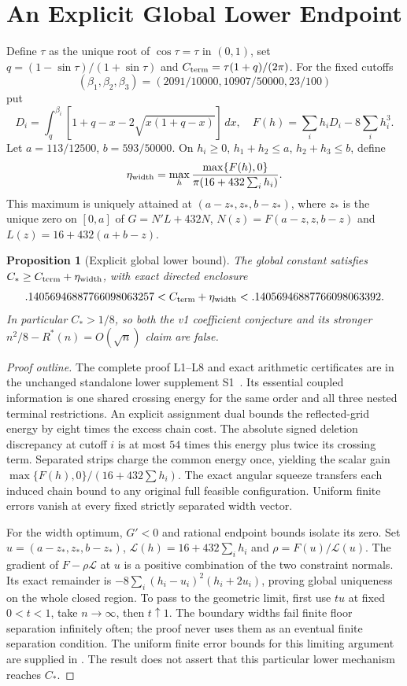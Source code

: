 \documentclass[11pt,letterpaper]{article}
\newtheorem{proposition}[theorem]{Proposition}
\theoremstyle{definition}\newtheorem{definition}[theorem]{Definition}
\theoremstyle{remark}\newtheorem{remark}[theorem]{Remark}
\newcommand{\Rstar}{R^\ast}
\newcommand{\CC}{C_\ast}
\begin{document}
\section{An Explicit Global Lower Endpoint}

Define $\tau$ as the unique root of $\cos\tau=\tau$ in $(0,1)$, set
$q=(1-\sin\tau)/(1+\sin\tau)$ and
$C_{\rm term}=\tau(1+q)/(2\pi)$.
For the fixed cutoffs
\[
 (\beta_1,\beta_2,\beta_3)=(2091/10000,10907/50000,23/100)
\]
put
\[
 D_i=\int_q^{\beta_i}[1+q-x-2\sqrt{x(1+q-x)}]\,dx,
 \quad F(h)=\sum_i h_iD_i-8\sum_i h_i^3.
\]
Let $a=113/12500$, $b=593/50000$. On
$h_i\ge0$, $h_1+h_2\le a$, $h_2+h_3\le b$, define
\[
 \eta_{\rm width}=\max_h
 \frac{\max\{F(h),0\}}{\pi(16+432\sum_i h_i)}.
\]
This maximum is uniquely attained at $(a-z_*,z_*,b-z_*)$, where $z_*$
is the unique zero on $[0,a]$ of $G=N'L+432N$,
$N(z)=F(a-z,z,b-z)$ and $L(z)=16+432(a+b-z)$.

\begin{proposition}[Explicit global lower bound]\label{prop:lower}
The global constant satisfies $\CC\ge C_{\rm term}+\eta_{\rm width}$,
with exact directed enclosure
\[
 .14056946887766098063257
 < C_{\rm term}+\eta_{\rm width}
 < .14056946887766098063392.
\]
In particular $\CC>1/8$, so both the v1 coefficient conjecture and its
stronger $n^2/8-\Rstar(n)=O(\sqrt n)$ claim are false.
\end{proposition}
\begin{proof}[Proof outline]
The complete proof L1--L8 and exact arithmetic certificates are in the
unchanged standalone lower supplement S1~\cite{lower}.
Its essential coupled information is one shared crossing energy for the
same order and all three nested terminal restrictions. An explicit assignment
dual bounds the reflected-grid energy by eight times the excess chain cost.
The absolute signed deletion discrepancy at cutoff $i$ is at most $54$
times this energy plus twice its crossing term. Separated strips charge
the common energy once, yielding
the scalar gain $\max\{F(h),0\}/(16+432\sum h_i)$.
The exact angular squeeze transfers each induced chain bound to any original
full feasible configuration. Uniform finite errors vanish at every fixed
strictly separated width vector.

For the width optimum, $G'<0$ and rational endpoint bounds isolate its zero.
Set $u=(a-z_*,z_*,b-z_*)$, $\mathcal L(h)=16+432\sum_i h_i$ and
$\rho=F(u)/\mathcal L(u)$. The gradient of $F-\rho\mathcal L$ at $u$ is a positive
combination of the two constraint normals. Its exact remainder is
$-8\sum_i(h_i-u_i)^2(h_i+2u_i)$, proving global uniqueness on the whole
closed region. To pass to the geometric limit, first use $tu$ at fixed
$0<t<1$, take $n\to\infty$, then $t\uparrow1$. The boundary
widths fail finite floor separation infinitely often; the proof never uses
them as an eventual finite separation condition. The uniform finite error bounds for this
limiting argument are supplied in \cite{lower}. The result does not assert
that this particular lower mechanism reaches $\CC$.
\end{proof}
\end{document}
